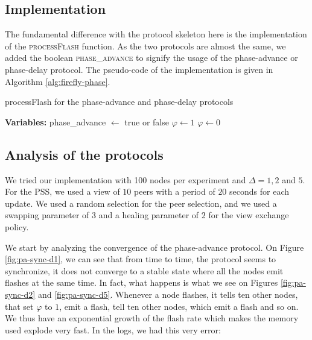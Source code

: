 \documentclass[a4paper, 11pt]{article}
\renewcommand{\phi}{\varphi}
\theoremstyle{plain}
\theoremstyle{definition}
\begin{document}
  \subsection{Implementation}
  \label{sec:implementation}

    The fundamental difference with the protocol skeleton here is the implementation of the
    \textsc{processFlash} function. As the two protocols are almost the same, we added the boolean
    \textsc{phase\_advance} to signify the usage of the phase-advance or phase-delay protocol. The pseudo-code
    of the implementation is given in Algorithm \ref{alg:firefly-phase}.

    \begin{algorithm}
     \caption{processFlash for the phase-advance and phase-delay protocols}
     \label{alg:firefly-phase}
     \begin{algorithmic}
       \State \textbf{Variables:}
       \State phase\_advance $\gets$ true or false      
       \State
           \State $\phi \gets 1$
         \Else
           \State $\phi \gets 0$
         \EndIf
       \EndFunction
     \end{algorithmic}
   \end{algorithm}



   \subsection{Analysis of the protocols}
   \label{sec:analysis-protocols}

     We tried our implementation with 100 nodes per experiment and $\Delta = 1, 2$ and $5$. For the
     PSS, we used a view of $10$ peers with a period of $20$ seconds for each update. We used a random
     selection for the peer selection, and we used a swapping parameter of $3$ and a healing parameter of $2$
     for the view exchange policy. 

     We start by analyzing the convergence of the phase-advance protocol. On Figure \ref{fig:pa-sync-d1}, we
     can see that from time to time, the protocol seems to synchronize, it does not converge to a stable state
     where all the nodes emit flashes at the same time. In fact, what happens is what we see on Figures
     \ref{fig:pa-sync-d2} and \ref{fig:pa-sync-d5}. Whenever a node flashes, it tells ten other nodes, that set
     $\phi$ to $1$, emit a flash, tell ten other nodes, which emit a flash and so on. We thus have an
     exponential growth of the flash rate which makes the memory used explode very fast. In the logs, we had
     this very error:
\end{document}

